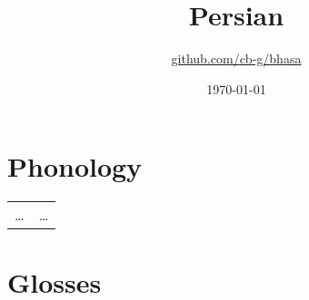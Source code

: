 \documentclass{article}
\title{Persian\\\ipa{[f6:R"si:]}}
\author{\href{https://github.com/cb-g/bhasa}{github.com/cb-g/bhasa}}
\date{\today}
\begin{document}
\pagecolor{custom_bg}\color{custom_fg}
\maketitle\thispagestyle{empty}

\newpage\setcounter{page}{1}\section{Phonology}

\begin{xltabular}{\textwidth}{lL}
  \dots & \dots \\
\end{xltabular}

\newpage\section{Glosses}
\end{document}
